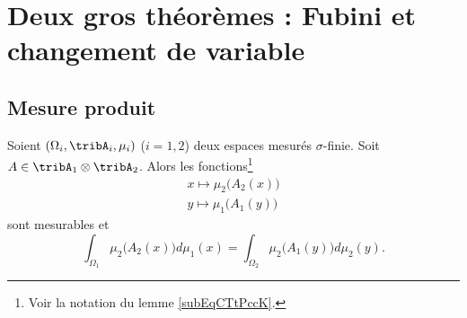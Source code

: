 \section{Deux gros théorèmes : Fubini et changement de variable}

\subsection{Mesure produit}

\begin{theorem}    \label{ThoCCIsLhO}
    Soient \( (\Omega_i,\tribA_i,\mu_i)\) (\( i=1,2\)) deux espaces mesurés \( \sigma\)-finie. Soit \( A\in\tribA_1\otimes \tribA_2\). Alors les fonctions\footnote{Voir la notation du lemme \ref{subEqCTtPccK}.}
    \begin{subequations}
        \begin{align}
            x\mapsto\mu_2\big( A_2(x) \big)\\
            y\mapsto\mu_1\big( A_1(y) \big)
        \end{align}
    \end{subequations}
    sont mesurables et
    \begin{equation}    \label{EqRKXwsQJ}
        \int_{\Omega_1}\mu_2\big( A_2(x) \big)d\mu_1(x)=\int_{\Omega_2}\mu_2\big( A_1(y) \big)d\mu_2(y).
    \end{equation}
\end{theorem}


